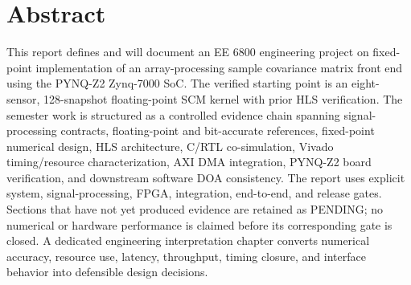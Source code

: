 \chapter*{Abstract}

This report defines and will document an EE 6800 engineering project on fixed-point
implementation of an array-processing sample covariance matrix front end using the
PYNQ-Z2 Zynq-7000 SoC. The verified starting point is an eight-sensor, 128-snapshot
floating-point SCM kernel with prior HLS verification. The semester work is structured as a
controlled evidence chain spanning signal-processing contracts, floating-point and
bit-accurate references, fixed-point numerical design, HLS architecture, C/RTL
co-simulation, Vivado timing/resource characterization, AXI DMA integration, PYNQ-Z2
board verification, and downstream software DOA consistency. The report uses explicit
system, signal-processing, FPGA, integration, end-to-end, and release gates. Sections that
have not yet produced evidence are retained as PENDING; no numerical or hardware
performance is claimed before its corresponding gate is closed. A dedicated engineering
interpretation chapter converts numerical accuracy, resource use, latency, throughput,
timing closure, and interface behavior into defensible design decisions.
